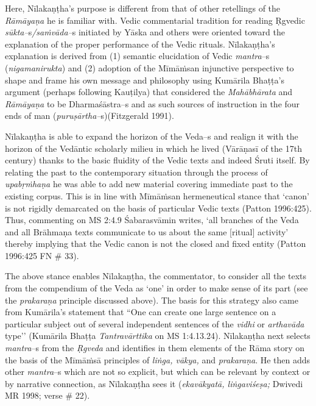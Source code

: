 Here, Nīlakaṇṭha’s purpose is different from that of other retellings of the \textit{Rāmāyaṇa} he is familiar with. Vedic commentarial tradition for reading Ṛgvedic \textit{sūkta–}s\textit{/saṁvāda–}s initiated by Yāska and others were oriented toward the explanation of the proper performance of the Vedic rituals. Nīlakaṇṭha's explanation is derived from (1) semantic elucidation of Vedic \textit{mantra}–s (\textit{nigamanirukta}) and (2) adoption of the Mīmāṁsan injunctive perspective to shape and frame his own message and philosophy using Kumārila Bhaṭṭa’s argument (perhaps following Kauṭilya) that considered the \textit{Mahābhārata} and \textit{Rāmāyaṇa} to be Dharmaśāstra–s and as such sources of instruction in the four ends of man (\textit{puruṣārtha–}s)(Fitzgerald 1991).

Nīlakaṇṭha is able to expand the horizon of the Veda–s and realign it with the horizon of the Vedāntic scholarly milieu in which he lived (Vārāṇasī of the 17th century) thanks to the basic fluidity of the Vedic texts and indeed Śruti itself. By relating the past to the contemporary situation through the process of \textit{upabṛṁhaṇa} he was able to add new material covering immediate past to the existing corpus. This is in line with Mīmāṁsan hermeneutical stance that ‘canon’ is not rigidly demarcated on the basis of particular Vedic texts (Patton 1996:425). Thus, commenting on MS 2:4.9 Śabarasvāmin writes, ‘all branches of the Veda and all Brāhmaṇa texts communicate to us about the same [ritual] activity’ thereby implying that the Vedic canon is not the closed and fixed entity (Patton 1996:425 FN \# 33).

The above stance enables Nīlakaṇṭha, the commentator, to consider all the texts from the compendium of the Veda as ‘one’ in order to make sense of its part (see the \textit{prakaraṇa} principle discussed above). The basis for this strategy also came from Kumārila’s statement that “One can create one large sentence on a particular subject out of several independent sentences of the \textit{vidhi} or \textit{arthavāda} type’’ (Kumārila Bhaṭṭa \textit{Tantravārttika} on MS 1:4.13.24). Nīlakaṇṭha next selects \textit{mantra}–s from the \textit{Ṛgveda} and identifies in them elements of the Rāma story on the basis of the Mīmāṁsā principles of \textit{liṅga, vākya,} and \textit{prakaraṇa}. He then adds other \textit{mantra}–s which are not so explicit, but which can be relevant by context or by narrative connection, as Nīlakaṇṭha sees it (\textit{ekavākyatā, liṅgaviśeṣa;} Dwivedi MR 1998; verse \# 22).

